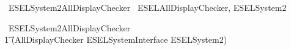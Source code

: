 \begin{zsection}
	\SECTION\ ESELSystem2AllDisplayChecker \parents\ ESELAllDisplayChecker, ESELSystem2
\end{zsection}

\begin{circus}
    \circprocess\ ESELSystem2AllDisplayChecker \circdef \\
        \t1 (AllDisplayChecker \lpar ESELSystemInterface \rpar ESELSystem2) \\
\end{circus}
